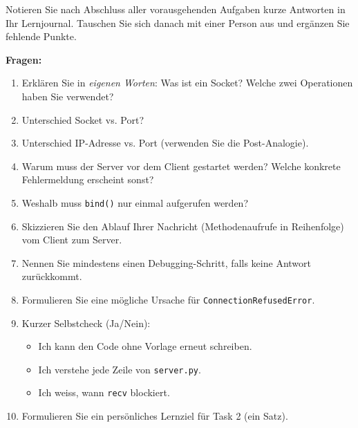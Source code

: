 \begin{myexercise}[Reflexionsfragen]
    Notieren Sie nach Abschluss aller vorausgehenden Aufgaben kurze Antworten in Ihr Lernjournal. Tauschen Sie sich danach mit einer Person aus und ergänzen Sie fehlende Punkte.

    \textbf{Fragen:}
    \begin{enumerate}
        \item Erklären Sie in \emph{eigenen Worten}: Was ist ein Socket? Welche zwei Operationen haben Sie verwendet?
        \item Unterschied Socket vs. Port?
        \item Unterschied \gls{IP}-Adresse vs. Port (verwenden Sie die Post-Analogie).
        \item Warum muss der Server vor dem Client gestartet werden? Welche konkrete Fehlermeldung erscheint sonst?
        \item Weshalb muss \lstinline|bind()| nur einmal aufgerufen werden?
        \item Skizzieren Sie den Ablauf Ihrer Nachricht (Methodenaufrufe in Reihenfolge) vom Client zum Server.
        \item Nennen Sie mindestens einen Debugging-Schritt, falls keine Antwort zurückkommt.
        \item Formulieren Sie eine mögliche Ursache für \texttt{ConnectionRefusedError}.
        \item Kurzer Selbstcheck (Ja/Nein):
              \begin{itemize}
                  \item Ich kann den Code ohne Vorlage erneut schreiben.
                  \item Ich verstehe jede Zeile von \texttt{server.py}.
                  \item Ich weiss, wann \texttt{recv} blockiert.
              \end{itemize}
        \item Formulieren Sie ein persönliches Lernziel für Task 2 (ein Satz).
    \end{enumerate}


\end{myexercise}
